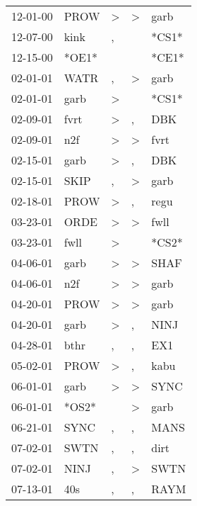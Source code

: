\begin{supertabular}{lllll}
 12-01-00 &   PROW &     \textgreater &     \textgreater &   garb \\
 12-07-00 &   kink &                , &                  &  *CS1* \\
 12-15-00 &  *OE1* &                  &                  &  *CE1* \\
 02-01-01 &   WATR &                , &     \textgreater &   garb \\
 02-01-01 &   garb &     \textgreater &                  &  *CS1* \\
 02-09-01 &   fvrt &     \textgreater &                , &    DBK \\
 02-09-01 &    n2f &     \textgreater &     \textgreater &   fvrt \\
 02-15-01 &   garb &     \textgreater &                , &    DBK \\
 02-15-01 &   SKIP &                , &     \textgreater &   garb \\
 02-18-01 &   PROW &     \textgreater &                , &   regu \\
 03-23-01 &   ORDE &     \textgreater &     \textgreater &   fwll \\
 03-23-01 &   fwll &     \textgreater &                  &  *CS2* \\
 04-06-01 &   garb &     \textgreater &     \textgreater &   SHAF \\
 04-06-01 &    n2f &     \textgreater &     \textgreater &   garb \\
 04-20-01 &   PROW &     \textgreater &     \textgreater &   garb \\
 04-20-01 &   garb &     \textgreater &                , &   NINJ \\
 04-28-01 &   bthr &                , &                , &    EX1 \\
 05-02-01 &   PROW &     \textgreater &                , &   kabu \\
 06-01-01 &   garb &     \textgreater &     \textgreater &   SYNC \\
 06-01-01 &  *OS2* &                  &     \textgreater &   garb \\
 06-21-01 &   SYNC &                , &                , &   MANS \\
 07-02-01 &   SWTN &                , &                , &   dirt \\
 07-02-01 &   NINJ &                , &     \textgreater &   SWTN \\
 07-13-01 &    40s &                , &                , &   RAYM \\

\end{supertabular}
